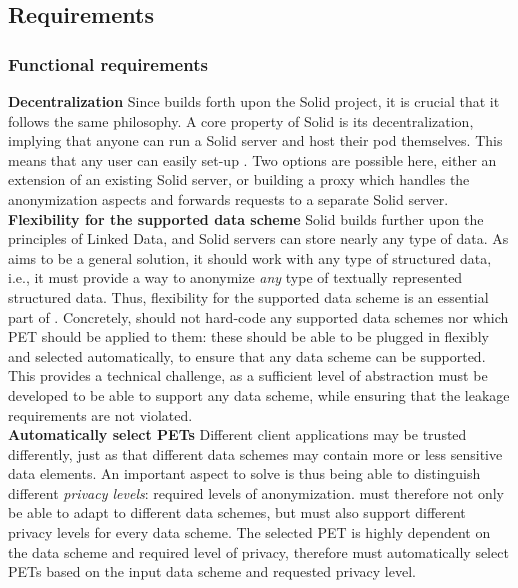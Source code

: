 \subsection{Requirements}

\subsubsection{Functional requirements}
\textbf{Decentralization} Since \middleware{} builds forth upon the Solid project, it is crucial that it follows the same philosophy. A core property of Solid is its decentralization, implying that anyone can run a Solid server and host their pod themselves. This means that any user can easily set-up \middleware{}. Two options are possible here, either an extension of an existing Solid server, or building a proxy which handles the anonymization aspects and forwards requests to a separate Solid server.\\

\noindent \textbf{Flexibility for the supported data scheme} Solid builds further upon the principles of Linked Data, and Solid servers can store nearly any type of data. As \middleware{} aims to be a general solution, it should work with any type of structured data, i.e., it must provide a way to anonymize \textit{any} type of textually represented structured data. Thus, flexibility for the supported data scheme is an essential part of \middleware{}. Concretely, \middleware{} should not hard-code any supported data schemes nor which PET should be applied to them: these should be able to be plugged in flexibly and selected automatically, to ensure that any data scheme can be supported. This provides a technical challenge, as a sufficient level of abstraction must be developed to be able to support any data scheme, while ensuring that the leakage requirements are not violated. \\

\noindent \textbf{Automatically select \gls{PETs}} Different client applications may be trusted differently, just as that different data schemes may contain more or less sensitive data elements. An important aspect to solve is thus being able to distinguish different \textit{privacy levels}: required levels of anonymization. \middleware{} must therefore not only be able to adapt to different data schemes, but must also support different privacy levels for every data scheme. The selected PET is highly dependent on the data scheme and required level of privacy, therefore \middleware{} must automatically select \gls{PETs} based on the input data scheme and requested privacy level. \\

